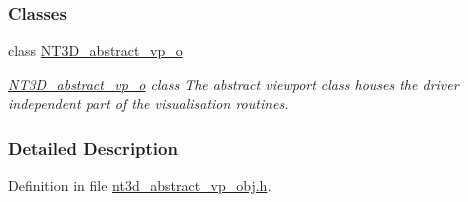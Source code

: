 \subsubsection*{Classes}
\begin{DoxyCompactItemize}
\item 
class \hyperlink{class_n_t3_d__abstract__vp__o}{NT3D\_\-abstract\_\-vp\_\-o}
\begin{DoxyCompactList}\small\item\em \hyperlink{class_n_t3_d__abstract__vp__o}{NT3D\_\-abstract\_\-vp\_\-o} class The abstract viewport class houses the driver independent part of the visualisation routines. \item\end{DoxyCompactList}\end{DoxyCompactItemize}


\subsubsection{Detailed Description}


Definition in file \hyperlink{nt3d__abstract__vp__obj_8h_source}{nt3d\_\-abstract\_\-vp\_\-obj.h}.

